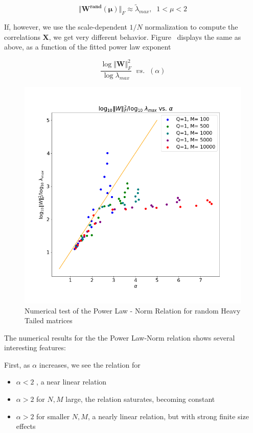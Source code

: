 $$\Vert\mathbf{W^{rand}(\mu)}\Vert_{F}\approx\tilde{\lambda}_{max},\;\;1<\mu<2$$

If, however, we use the scale-dependent $1/N$ normalization to compute the correlations $\mathbf{X}$, we get very different behavior.
Figure~\cite{randW} displays the same as above, as a function of the fitted power law exponent

$$\dfrac{\log\Vert\mathbf{W}\Vert^{2}_{F}}{\log\lambda_{max}}\;\;vs.\;\;(\alpha)$$


\begin{figure}[!htb]
 \centering
   \includegraphics[scale=0.40]{img/Alpha-LogNorm-Relations.png}
   \caption{
Numerical test of the  Power Law - Norm Relation for random Heavy Tailed matrices
}
  \label{fig:randW}
\end{figure}


The numerical results for the the Power Law-Norm relation shows several interesting features: 

First, as $\alpha$ increases, we see the relation for

\begin{itemize}
\item  $\alpha<2$ , a near linear relation 
\item  $\alpha>2$ for $N,M$ large, the relation saturates, becoming constant
\item   $\alpha>2$  for smaller $N,M$,  a nearly linear relation, but with strong finite size effects
\end{itemize}


